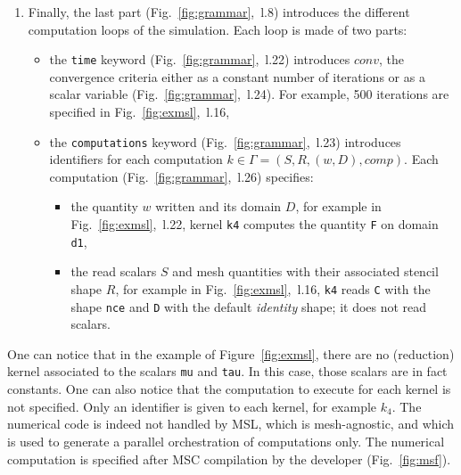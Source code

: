 \begin{enumerate}
\item Finally, the last part (Fig.~\ref{fig:grammar},~l.8) introduces the different computation loops of the simulation. Each loop is made of two parts:
\begin{itemize}
\item the \texttt{time} keyword (Fig.~\ref{fig:grammar},~l.22) introduces $conv$, the convergence criteria either as a constant number of iterations or as a scalar variable (Fig.~\ref{fig:grammar},~l.24). For example, 500 iterations are specified in Fig.~\ref{fig:exmsl},~l.16,
\item the \texttt{computations} keyword (Fig.~\ref{fig:grammar},~l.23) introduces identifiers for each computation $k\in\Gamma=(S,R,(w,D),comp)$. Each computation (Fig.~\ref{fig:grammar},~l.26) specifies:
\begin{itemize}
 \item the quantity $w$ written and its domain $D$, for example in Fig.~\ref{fig:exmsl},~l.22, kernel \texttt{k4} computes the quantity \texttt{F} on domain \texttt{d1},
 \item the read scalars $S$ and mesh quantities with their associated stencil shape $R$, for example in Fig.~\ref{fig:exmsl},~l.16, \texttt{k4} reads \texttt{C} with the shape \texttt{nce} and \texttt{D} with the default \textit{identity} shape; it does not read scalars.
 \end{itemize}
\end{itemize}
\end{enumerate}

One can notice that in the example of Figure~\ref{fig:exmsl}, there are no (reduction) kernel associated to the scalars \texttt{mu} and \texttt{tau}.
In this case, those scalars are in fact constants.
One can also notice that the computation to execute for each kernel is not specified. Only an identifier is given to each kernel, for example $k_4$. The numerical code is indeed not handled by MSL, which is mesh-agnostic, and which is used to generate a parallel orchestration of computations only. The numerical computation is specified after MSC compilation by the developer (Fig.~\ref{fig:msf}).

